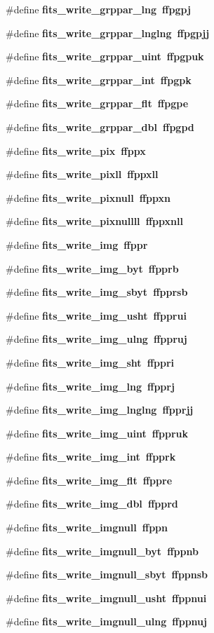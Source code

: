\begin{CompactItemize}
\#define \bf{fits\_\-write\_\-grppar\_\-lng}~ffpgpj
\item 
\#define \bf{fits\_\-write\_\-grppar\_\-lnglng}~ffpgpjj
\item 
\#define \bf{fits\_\-write\_\-grppar\_\-uint}~ffpgpuk
\item 
\#define \bf{fits\_\-write\_\-grppar\_\-int}~ffpgpk
\item 
\#define \bf{fits\_\-write\_\-grppar\_\-flt}~ffpgpe
\item 
\#define \bf{fits\_\-write\_\-grppar\_\-dbl}~ffpgpd
\item 
\#define \bf{fits\_\-write\_\-pix}~ffppx
\item 
\#define \bf{fits\_\-write\_\-pixll}~ffppxll
\item 
\#define \bf{fits\_\-write\_\-pixnull}~ffppxn
\item 
\#define \bf{fits\_\-write\_\-pixnullll}~ffppxnll
\item 
\#define \bf{fits\_\-write\_\-img}~ffppr
\item 
\#define \bf{fits\_\-write\_\-img\_\-byt}~ffpprb
\item 
\#define \bf{fits\_\-write\_\-img\_\-sbyt}~ffpprsb
\item 
\#define \bf{fits\_\-write\_\-img\_\-usht}~ffpprui
\item 
\#define \bf{fits\_\-write\_\-img\_\-ulng}~ffppruj
\item 
\#define \bf{fits\_\-write\_\-img\_\-sht}~ffppri
\item 
\#define \bf{fits\_\-write\_\-img\_\-lng}~ffpprj
\item 
\#define \bf{fits\_\-write\_\-img\_\-lnglng}~ffpprjj
\item 
\#define \bf{fits\_\-write\_\-img\_\-uint}~ffppruk
\item 
\#define \bf{fits\_\-write\_\-img\_\-int}~ffpprk
\item 
\#define \bf{fits\_\-write\_\-img\_\-flt}~ffppre
\item 
\#define \bf{fits\_\-write\_\-img\_\-dbl}~ffpprd
\item 
\#define \bf{fits\_\-write\_\-imgnull}~ffppn
\item 
\#define \bf{fits\_\-write\_\-imgnull\_\-byt}~ffppnb
\item 
\#define \bf{fits\_\-write\_\-imgnull\_\-sbyt}~ffppnsb
\item 
\#define \bf{fits\_\-write\_\-imgnull\_\-usht}~ffppnui
\item 
\#define \bf{fits\_\-write\_\-imgnull\_\-ulng}~ffppnuj
\item 

\end{CompactItemize}
